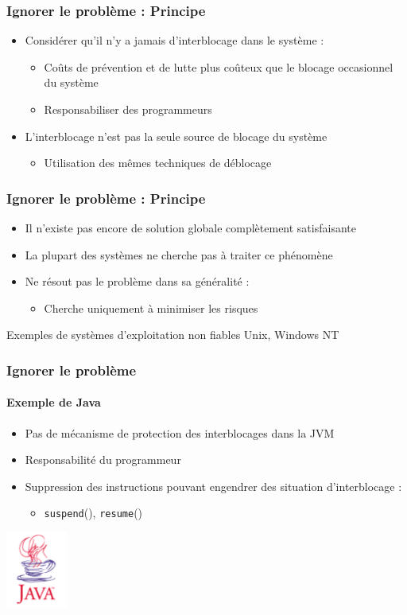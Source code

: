 \begin{frame}
\frametitle{Ignorer le problème : Principe}
\begin{itemize}
\item Considérer qu’il n’y a jamais d’interblocage dans le système :
\begin{itemize}
\item Coûts de prévention et de lutte plus coûteux que le blocage occasionnel du système
\item Responsabiliser des programmeurs
\end{itemize}
\item L’interblocage n’est pas la seule source de blocage du système
\begin{itemize}
\item Utilisation des mêmes techniques de déblocage
\end{itemize}
\end{itemize}
\end{frame}

\begin{frame}
\frametitle{Ignorer le problème : Principe}
\begin{itemize}
\item Il n’existe pas encore de solution globale complètement satisfaisante
\item La plupart des systèmes ne cherche pas à traiter ce phénomène
\item Ne résout pas le problème dans sa généralité :
\begin{itemize}
\item Cherche uniquement à minimiser les risques
\end{itemize}
\end{itemize}
\begin{exampleblock}{Exemples de systèmes d'exploitation non fiables}
Unix, Windows NT
\end{exampleblock}

\end{frame}

\begin{frame}
\frametitle{Ignorer le problème}
\framesubtitle{Exemple de Java}
\begin{itemize}
\item Pas de mécanisme de protection des interblocages dans la JVM
\item Responsabilité du programmeur
\item Suppression des instructions pouvant engendrer des situation d’interblocage :
\begin{itemize}
\item \texttt{suspend}(), \texttt{resume}()
\end{itemize}
\end{itemize}
\includegraphics[width=2cm]{../illustration/java.png}
\end{frame}



